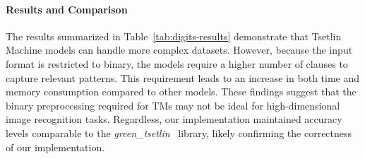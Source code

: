 \documentclass[english]{aghengthesis} %
\newcommand*{\GreenTsetlinName}{\emph{green\_tsetlin}~\cite{glimsdal2024greentsetlin} }
\begin{document}
\paragraph{Results and Comparison}
The results summarized in Table~\ref{tab:digits-results} demonstrate that Tsetlin Machine models can handle more complex datasets. However, because the input format is restricted to binary, the models require a higher number of clauses to capture relevant patterns. This requirement leads to an increase in both time and memory consumption compared to other models. These findings suggest that the binary preprocessing required for TMs may not be ideal for high-dimensional image recognition tasks. Regardless, our implementation maintained accuracy levels comparable to the \GreenTsetlinName library, likely confirming the correctness of our implementation.
\end{document}
